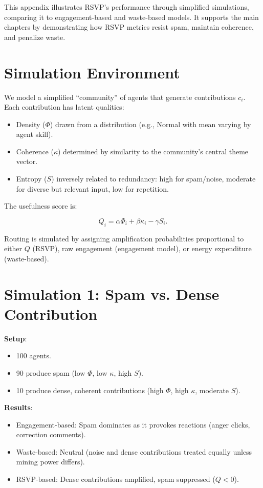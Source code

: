 \documentclass[openany]{book}
\begin{document}
This appendix illustrates RSVP’s performance through simplified simulations, comparing it to engagement-based and waste-based models. It supports the main chapters by demonstrating how RSVP metrics resist spam, maintain coherence, and penalize waste.

\section{Simulation Environment}

We model a simplified ``community'' of agents that generate contributions $c_i$. Each contribution has latent qualities:

\begin{itemize}
    \item Density ($\Phi$) drawn from a distribution (e.g., Normal with mean varying by agent skill).
    \item Coherence ($\kappa$) determined by similarity to the community’s central theme vector.
    \item Entropy ($S$) inversely related to redundancy: high for spam/noise, moderate for diverse but relevant input, low for repetition.
\end{itemize}

The usefulness score is:

\[ Q_i = \alpha \Phi_i + \beta \kappa_i - \gamma S_i. \]

Routing is simulated by assigning amplification probabilities proportional to either $Q$ (RSVP), raw engagement (engagement model), or energy expenditure (waste-based).

\section{Simulation 1: Spam vs. Dense Contribution}

\textbf{Setup}:

\begin{itemize}
    \item 100 agents.
    \item 90 produce spam (low $\Phi$, low $\kappa$, high $S$).
    \item 10 produce dense, coherent contributions (high $\Phi$, high $\kappa$, moderate $S$).
\end{itemize}

\textbf{Results}:

\begin{itemize}
    \item Engagement-based: Spam dominates as it provokes reactions (anger clicks, correction comments).
    \item Waste-based: Neutral (noise and dense contributions treated equally unless mining power differs).
    \item RSVP-based: Dense contributions amplified, spam suppressed ($Q < 0$).
\end{itemize}
\end{document}
